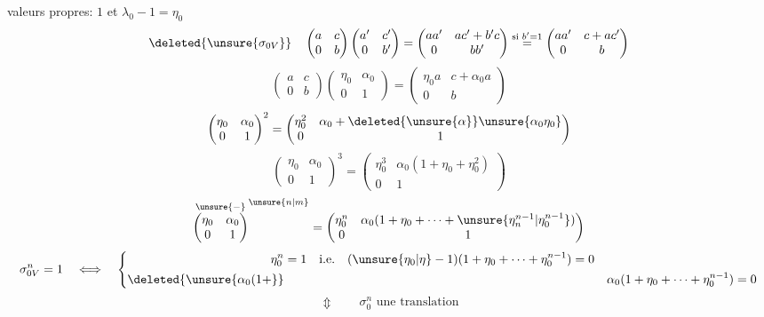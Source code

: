 valeurs propres: $1$ et $\lambda_0-1=\eta_0$
\[
\deleted{\unsure{\sigma_{0V}}}\quad
\begin{pmatrix}a&c\\0&b\end{pmatrix}
\begin{pmatrix}a'&c'\\0&b'\end{pmatrix}
=\begin{pmatrix}aa'&ac'+b'c\\0&bb'\end{pmatrix}
\overset{\text{si }b'=1}{=}\begin{pmatrix}aa'&c+ac'\\0&b\end{pmatrix}
\]
\[
\begin{pmatrix}a&c\\0&b\end{pmatrix}
\begin{pmatrix}\eta_0&\alpha_0\\0&1\end{pmatrix}
=\begin{pmatrix}\eta_0a&c+\alpha_0a\\0&b\end{pmatrix}
\]
\[
\begin{pmatrix}\eta_0&\alpha_0\\0&1\end{pmatrix}^{2}
=\begin{pmatrix}\eta_0^2&\alpha_0+\deleted{\unsure{\alpha}}\unsure{\alpha_0\eta_0}\\0&1\end{pmatrix}
\]
\[
\begin{pmatrix}\eta_0&\alpha_0\\0&1\end{pmatrix}^{3}
=\begin{pmatrix}\eta_0^3&\alpha_0(1+\eta_0+\eta_0^2)\\0&1\end{pmatrix}
\]
\[
\overset{\unsure{-}}{\begin{pmatrix}\eta_0&\alpha_0\\0&1\end{pmatrix}}^{\unsure{n|m}}
=\begin{pmatrix}\eta_0^n&\alpha_0(1+\eta_0+\cdots+\unsure{\eta_n^{n-1}|\eta_0^{n-1}})\\0&1\end{pmatrix}
\]
\[
\sigma_{0V}^n=1\quad\Longleftrightarrow\quad
\left\{\begin{aligned}
\eta_0^n&=1\quad\text{i.e.}\quad(\unsure{\eta_0|\eta}-1)(1+\eta_0+\cdots+\eta_0^{n-1})=0\\
\deleted{\unsure{\alpha_0(1+}}&&\alpha_0(1+\eta_0+\cdots+\eta_0^{n-1})=0
\end{aligned}\right.
\]
\[
\Updownarrow\qquad\sigma_0^n\text{ une translation}
\]

